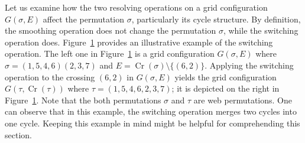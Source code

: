\documentclass[reqno,12pt]{amsart}
\theoremstyle{definition}
\theoremstyle{remark}
\newcommand\Cr{\operatorname{Cr}}
\newcommand\Xmarking[2]
{\draw[very thick] (#1-0.7,#2-0.7)--(#1-0.3,#2-0.3);
\draw[very thick] (#1-0.7,#2-0.3)--(#1-0.3,#2-0.7);
\draw (#1-1,#2-0.5)--(#1-0.5,#2-0.5);
\draw (#1-0.5,#2-0.5)--(#1-0.5,#2); }
\newcommand\Cross[2]
{\draw (#1-0.5,#2)--(#1-0.5,#2-1);
\draw (#1,#2-0.5)--(#1-1,#2-0.5); }
\newcommand\UP[2]{\draw (#1-0.5,#2)--(#1-0.5,#2-1);}
\newcommand\EAST[2]{\draw (#1,#2-0.5)--(#1-1,#2-0.5);}
\newcommand\Asmooth[2]
{\draw (#1,#2-0.5) .. controls (#1-0.45,#2-0.45) and (#1-0.45,#2-0.45) .. (#1-0.5,#2);
\draw (#1-1,#2-0.5) .. controls (#1-0.55,#2-0.55) and (#1-0.55,#2-0.55) .. (#1-0.5,#2-1); }
\begin{document}
Let us examine how the two resolving operations on a grid configuration
\( G(\sigma,E) \) affect the permutation \( \sigma \), particularly its cycle structure.
By definition, the smoothing operation does not change the permutation \(\sigma\),
while the switching operation does.
Figure~\ref{fig:switching_example} provides an illustrative example of the switching operation.
The left one in Figure~\ref{fig:switching_example} is a grid
configuration \( G(\sigma, E) \) where \( \sigma=(1,5,4,6)(2,3,7) \)
and \( E=\Cr(\sigma)\setminus\{(6,2)\} \).
Applying the switching operation to the crossing \( (6,2) \) in \( G(\sigma,E) \)
yields the grid configuration \( G(\tau, \Cr(\tau)) \) where \( \tau=(1,5,4,6,
2,3,7) \); it is depicted on the right in Figure~\ref{fig:switching_example}.
Note that the both permutations \( \sigma \) and \( \tau \) are web permutations.
One can observe that in this example, the switching operation merges two cycles
into one cycle.
Keeping this example in mind might be helpful for comprehending this section.

\begin{figure}
  \qquad\qquad
  \caption{}
  \label{fig:switching_example}
\end{figure}
\end{document}
